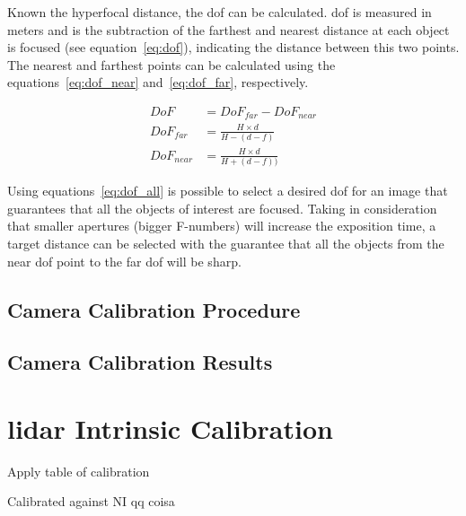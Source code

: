 Known the hyperfocal distance, the \acf{dof} can be calculated. \ac{dof} is measured in meters and is the subtraction of the farthest and nearest distance at each object is focused (see equation~\ref{eq:dof}), indicating the distance between this two points\cite{Photopillers, Merklinger1993, mvg_book}. The nearest and farthest points can be calculated using the equations~\ref{eq:dof_near} and~\ref{eq:dof_far}, respectively.

\begin{subequations}
	\label{eq:dof_all}
	\begin{align}
		DoF & = DoF_{far} - DoF_{near} \label{eq:dof} \\
		DoF_{far} & = \frac{H\times d}{H - (d - f)} \label{eq:dof_far} \\
		DoF_{near} & = \frac{H\times d}{H + (d - f))} \label{eq:dof_near} 
	\end{align}
\end{subequations}

Using equations~\ref{eq:dof_all} is possible to select a desired \acl{dof} for an image that guarantees that all the objects of interest are focused. Taking in consideration that smaller apertures (bigger F-numbers) will increase the exposition time\cite{Merklinger1993}, a target distance can be selected with the guarantee that all the objects from the near \ac{dof} point to the far \ac{dof} will be sharp.

\subsection{Camera Calibration Procedure}

\subsection{Camera Calibration Results}

\section{\ac{lidar} Intrinsic Calibration}
Apply table of calibration 

Calibrated against NI qq coisa

